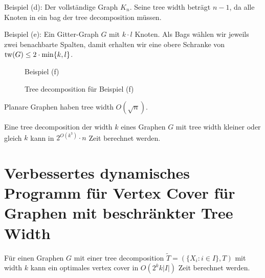   Beispiel (d): Der vollständige Graph \(K_n\). Seine tree width beträgt \(n-1\), da alle Knoten in ein bag der tree decomposition müssen.

  Beispiel (e): Ein Gitter-Graph \(G\) mit \(k \cdot l\) Knoten. Als Bags wählen wir jeweils zwei benachbarte Spalten, damit erhalten wir eine obere Schranke von \(\operatorname{tw}(G) \leq 2 \cdot \min \{ k,l \}\).

  
  \begin{figure}[H]
    \centerline{
    }
    \caption{Beispiel (f)}
  \end{figure}

  \begin{figure}[H]
    \centerline{
    }
    \caption{Tree decomposition für Beispiel (f)}
  \end{figure}
  
  \begin{theorem}
    Planare Graphen haben tree width \(O(\sqrt{n})\).
  \end{theorem}

  \begin{theorem}
    Eine tree decomposition der width \(k\) eines Graphen \(G\) mit tree width kleiner oder gleich \(k\) kann in \(2^{O(k^3)} \cdot n\) Zeit berechnet werden.
  \end{theorem}

\section{Verbessertes dynamisches Programm für Vertex Cover für Graphen mit beschränkter Tree Width}
  
  \begin{theorem}
    Für einen Graphen \(G\) mit einer tree decomposition \(\widetilde{T} = ( \{ X_i : i \in I \}, T) \) mit width \(k\) kann ein optimales vertex cover in \(O(2^k k |I|)\) Zeit berechnet werden.
  \end{theorem}

